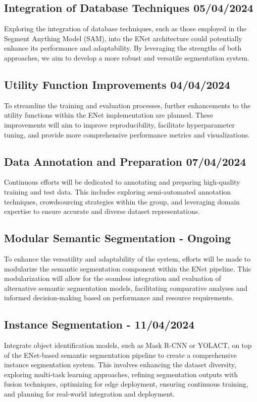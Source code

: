 \subsection{Integration of Database Techniques 05/04/2024}
Exploring the integration of database techniques, such as those employed in the Segment Anything Model (SAM), into the ENet architecture could potentially enhance its performance and adaptability. By leveraging the strengths of both approaches, we aim to develop a more robust and versatile segmentation system.
\subsection{Utility Function Improvements 04/04/2024}
To streamline the training and evaluation processes, further enhancements to the utility functions within the ENet implementation are planned. These improvements will aim to improve reproducibility, facilitate hyperparameter tuning, and provide more comprehensive performance metrics and visualizations.
\subsection{Data Annotation and Preparation 07/04/2024}
Continuous efforts will be dedicated to annotating and preparing high-quality training and test data. This includes exploring semi-automated annotation techniques, crowdsourcing strategies within the group, and leveraging domain expertise to ensure accurate and diverse dataset representations.
\subsection{Modular Semantic Segmentation - Ongoing}
To enhance the versatility and adaptability of the system, efforts will be made to modularize the semantic segmentation component within the ENet pipeline. This modularization will allow for the seamless integration and evaluation of alternative semantic segmentation models, facilitating comparative analyses and informed decision-making based on performance and resource requirements.

\subsection{Instance Segmentation - 11/04/2024}
Integrate object identification models, such as Mask R-CNN or YOLACT, on top of the ENet-based semantic segmentation pipeline to create a comprehensive instance segmentation system. This involves enhancing the dataset diversity, exploring multi-task learning approaches, refining segmentation outputs with fusion techniques, optimizing for edge deployment, ensuring continuous training, and planning for real-world integration and deployment.

